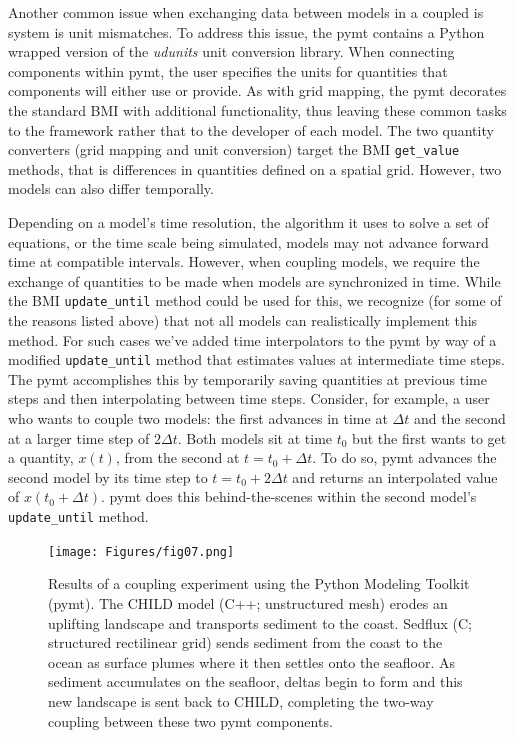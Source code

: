 \documentclass[journal abbreviation, manuscript]{copernicus}
\begin{document}
Another common issue when exchanging data between
models in a coupled is system is unit mismatches. To address this issue, the pymt contains a Python
wrapped version of the \textit{udunits} unit conversion library.
When connecting components within pymt, the user specifies
the units for quantities that components will either use or
provide. As with grid mapping, the pymt decorates the standard
BMI with additional functionality, thus leaving these common
tasks to the framework rather that to the developer of each model. 
The two quantity converters (grid mapping and
unit conversion) target the BMI \texttt{get\_value} methods, that is
differences in quantities defined on a spatial grid. However,
two models can also differ temporally.

Depending on a model's time resolution, the algorithm it uses
to solve a set of equations, or the time scale being simulated,
models may not advance forward time at compatible intervals.
However, when coupling models, we require the exchange of quantities
to be made when models are synchronized in time.  While the BMI
\texttt{update\_until} method could be used for this, we recognize
(for some of the reasons listed above) that not all models
can realistically implement this method. For such cases we've
added time interpolators to the pymt by way of a modified
\texttt{update\_until} method that estimates values at intermediate time
steps. The pymt accomplishes this by temporarily saving quantities
at previous time steps and then interpolating between time steps.
Consider, for example, a user who wants to couple two models:
the first advances in time at $\Delta t$ and the second
at a larger time step of $2 \Delta t$. Both models sit at time $t_0$ but the first
wants to get a quantity, $x(t)$, from the second at $t = t_0 + \Delta t$.
To do so, pymt advances the second model by its time step to $t = t_0 + 2 \Delta t$
and returns an interpolated value of $x(t_0 + \Delta t)$.
pymt does this behind-the-scenes within the second model's
\texttt{update\_until} method.

\begin{figure}[h!]
\centering
\texttt{[image: Figures/fig07.png]}
\caption{Results of a coupling experiment using the Python Modeling Toolkit (pymt).
The CHILD model (C++; unstructured mesh) erodes an uplifting landscape and
transports sediment to the coast. Sedflux (C; structured rectilinear grid)
sends sediment from the coast to the ocean as surface plumes
where it then settles onto the seafloor. As sediment accumulates on the seafloor,
deltas begin to form and this new landscape is sent back to CHILD, completing the two-way coupling
between these two pymt components.}
\label{fig:child_sedflux}
\end{figure}
\end{document}

